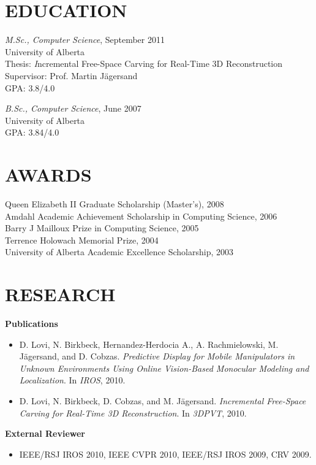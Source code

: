 \documentclass{res}
\begin{document}
\begin{resume}
\section{EDUCATION}
    \textit{M.Sc., Computer Science}, September 2011\\
    University of Alberta\\
    \hspace*{2.5em} Thesis: {\textit Incremental Free-Space Carving for Real-Time 3D Reconstruction}\\
    \hspace*{2.5em} Supervisor: Prof. Martin J{\"a}gersand\\
    \hspace*{2.5em} GPA: 3.8/4.0

    \textit{B.Sc., Computer Science}, June 2007\\
    University of Alberta\\
    \hspace*{2.5em} GPA: 3.84/4.0


\section{AWARDS}
    Queen Elizabeth II Graduate Scholarship (Master's), 2008\\
    Amdahl Academic Achievement Scholarship in Computing Science, 2006\\
    Barry J Mailloux Prize in Computing Science, 2005\\
    Terrence Holowach Memorial Prize, 2004\\
    University of Alberta Academic Excellence Scholarship, 2003


\section{RESEARCH}
    \textbf{Publications}\vspace*{0.666ex}
    \begin{itemize}[label={}, labelsep=*, leftmargin=2.8em]
        \item D. Lovi, N. Birkbeck, Hernandez-Herdocia A., A. Rachmielowski, M. J{\"a}gersand, and D. \hspace*{1.5em}Cobzas.  \textit{Predictive Display for Mobile Manipulators in Unknown Environments Using \hspace*{1.5em}Online Vision-Based Monocular Modeling and Localization}. In \textit{IROS}, 2010.
        \item D. Lovi, N. Birkbeck, D. Cobzas, and M. J{\"a}gersand. \textit{Incremental Free-Space Carving for \hspace*{1.5em}Real-Time 3D Reconstruction}. In \textit{3DPVT}, 2010.
    \end{itemize}
    \textbf{External Reviewer}
    \begin{itemize}[label={}, labelsep=*, leftmargin=2.8em]
    \item IEEE/RSJ IROS 2010, IEEE CVPR 2010, IEEE/RSJ IROS 2009, CRV 2009.
    \end{itemize}



\end{resume}
\end{document}
